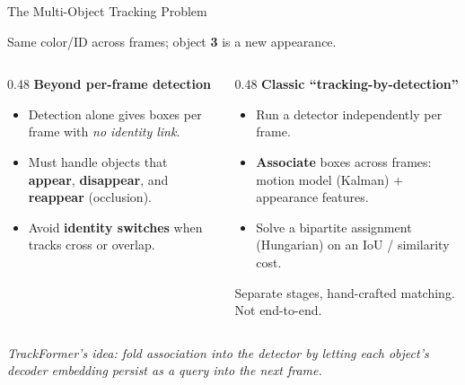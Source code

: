 \begin{frame}{The Multi-Object Tracking Problem}
\begin{center}
{}
  \end{center}
  \vspace{-0.1em}
  \begin{center}{\footnotesize Same color/ID across frames; object \textbf{3} is a new appearance.}\end{center}

  \vspace{0.2em}
  \begin{columns}[T]
    \begin{column}{0.48\textwidth}
      \textbf{Beyond per-frame detection}
      \begin{itemize}
        \item Detection alone gives boxes per frame with \emph{no identity link}.
        \item Must handle objects that \textbf{appear}, \textbf{disappear}, and \textbf{reappear} (occlusion).
        \item Avoid \textbf{identity switches} when tracks cross or overlap.
      \end{itemize}
    \end{column}
    \begin{column}{0.48\textwidth}
      \textbf{Classic ``tracking-by-detection''} 
      \begin{itemize}
        \item Run a detector independently per frame.
        \item \textbf{Associate} boxes across frames: motion model (Kalman) $+$ appearance features.
        \item Solve a bipartite assignment (Hungarian) on an IoU / similarity cost.
      \end{itemize}
      \vspace{0.1em}
      {\footnotesize Separate stages, hand-crafted matching. Not end-to-end.}
    \end{column}
  \end{columns}

  \vspace{0.3em}
  \begin{center}
    \footnotesize\itshape TrackFormer's idea: fold association \emph{into} the detector by letting each object's decoder embedding persist as a query into the next frame.
  \end{center}
\end{frame}

